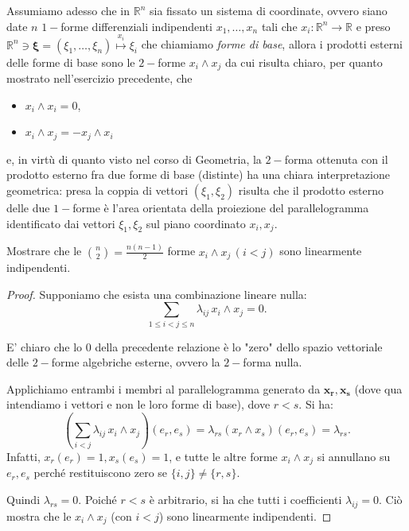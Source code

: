 Assumiamo adesso che in $\mathbb{R}^n$ sia fissato un sistema di coordinate, ovvero siano date $n$ $1-$forme differenziali indipendenti $x_1, \ldots, x_n$ tali che $x_i: \mathbb{R}^n \to \mathbb{R}$ e preso $\mathbb{R}^n \ni \mathbf{\xi} = (\xi_1, \ldots, \xi_n) \stackrel{x_i}{\mapsto} \xi_i$ che chiamiamo \emph{forme di base}, allora i prodotti esterni delle forme di base sono le $2-$forme $x_i \wedge x_j$ da cui risulta chiaro, per quanto mostrato nell'esercizio precedente, che
\begin{itemize}
    \item $x_i \wedge x_i = 0$,
    \item $x_i \wedge x_j = - x_j \wedge x_i$
\end{itemize}
e, in virtù di quanto visto nel corso di Geometria, la $2-$forma ottenuta con il prodotto esterno fra due forme di base (distinte) ha una chiara interpretazione geometrica: presa la coppia di vettori $(\xi_1, \xi_2)$ risulta che il prodotto esterno delle due $1-$forme è l'area orientata della proiezione del parallelogramma identificato dai vettori $\xi_1, \xi_2$ sul piano coordinato $x_i, x_j$.
\begin{exercise}
    Mostrare che le $\binom{n}{2} = \frac{n(n-1)}{2}$ forme $x_i \wedge x_j \, (i < j)$ sono linearmente indipendenti.
\end{exercise}
\begin{proof}
    Supponiamo che esista una combinazione lineare nulla:
    \[
        \sum_{1 \le i < j \le n} \lambda_{ij} \, x_i \wedge x_j = 0.
    \]
    \begin{remark}
        E' chiaro che lo $0$ della precedente relazione è lo "zero" dello spazio vettoriale delle $2-$forme algebriche esterne, ovvero la $2-$forma nulla.
    \end{remark}
    Applichiamo entrambi i membri al parallelogramma generato da \( \mathbf{x_r}, \mathbf{x_s} \) (dove qua intendiamo i vettori e non le loro forme di base), dove \( r < s \). Si ha:
    \[
        \left( \sum_{i < j} \lambda_{ij} \, x_i \wedge x_j \right)(e_r, e_s) = \lambda_{rs} (x_r \wedge x_s)(e_r, e_s) = \lambda_{rs}.
    \]
    Infatti, \( x_r(e_r) = 1, x_s(e_s) = 1 \), e tutte le altre forme \( x_i \wedge x_j \) si annullano su \( e_r, e_s \) perché restituiscono zero se \( \{i,j\} \ne \{r,s\} \).

    Quindi \( \lambda_{rs} = 0 \). Poiché \( r < s \) è arbitrario, si ha che tutti i coefficienti \( \lambda_{ij} = 0 \). Ciò mostra che le \( x_i \wedge x_j \) (con \( i < j \)) sono linearmente indipendenti.
\end{proof}
